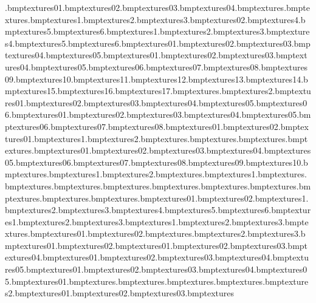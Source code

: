 \gate.bmp textures\gen01.bmp textures\gen02.bmp textures\gen03.bmp textures\gen04.bmp textures\grass.bmp textures\grasscracks.bmp textures\grassedge1.bmp textures\grassedge2.bmp textures\grassedge3.bmp textures\hubpathcorner02.bmp textures\grassedge4.bmp textures\grassedge5.bmp textures\grassedge6.bmp textures\grassshad1.bmp textures\grassshad2.bmp textures\grassshad3.bmp textures\grassshad4.bmp textures\grassshad5.bmp textures\grassshad6.bmp textures\grasstocobble01.bmp textures\grasstocobble02.bmp textures\grasstocobble03.bmp textures\grasstocobble04.bmp textures\grasstocobble05.bmp textures\grasstosand01.bmp textures\grasstosand02.bmp textures\grasstosand03.bmp textures\grasstosand04.bmp textures\grasstosand05.bmp textures\grasstosand06.bmp textures\grasstosand07.bmp textures\grasstosand08.bmp textures\grasstosand09.bmp textures\grasstosand10.bmp textures\grasstosand11.bmp textures\grasstosand12.bmp textures\grasstosand13.bmp textures\grasstosand14.bmp textures\grasstosand15.bmp textures\grasstosand16.bmp textures\grasstosand17.bmp textures\housefloor.bmp textures\housefloor2.bmp textures\hubflowers01.bmp textures\hubflowers02.bmp textures\hubflowers03.bmp textures\hubflowers04.bmp textures\hubflowers05.bmp textures\hubflowers06.bmp textures\hubpath01.bmp textures\hubpath02.bmp textures\hubpath03.bmp textures\hubpath04.bmp textures\hubpath05.bmp textures\hubpath06.bmp textures\hubpath07.bmp textures\hubpath08.bmp textures\hubpathbrick01.bmp textures\hubpathbrick02.bmp textures\hubpathcorner01.bmp textures\hutbrick1.bmp textures\hutbrick2.bmp textures\hutcabtowel.bmp textures\hutceiling.bmp textures\hutcooker.bmp textures\hutfloor.bmp textures\hutfood01.bmp textures\hutfood02.bmp textures\hutfood03.bmp textures\hutfood04.bmp textures\hutfood05.bmp textures\hutfood06.bmp textures\hutfood07.bmp textures\hutfood08.bmp textures\hutfood09.bmp textures\hutfood10.bmp textures\hutsign.bmp textures\hutsink1.bmp textures\hutsink2.bmp textures\hutstripes.bmp textures\hutstripes1.bmp textures\hutstripesbar.bmp textures\hutwall.bmp textures\hutwallcolours.bmp textures\hutwallpans.bmp textures\hutwallplates.bmp textures\hutwallspice.bmp textures\hutworkbread.bmp textures\hutworkbrush.bmp textures\hutworkcorner.bmp textures\hutworks.bmp textures\icecream01.bmp textures\icecream02.bmp textures\icewall1.bmp textures\icewall2.bmp textures\icewall3.bmp textures\icewall4.bmp textures\icewall5.bmp textures\icewall6.bmp textures\icewallex1.bmp textures\icewallex2.bmp textures\icewallex3.bmp textures\icewallexshine1.bmp textures\icewallexshine2.bmp textures\icewallexshine3.bmp textures\jhut.bmp textures\jhutboard01.bmp textures\jhutboard02.bmp textures\jhutbrik.bmp textures\jhutbrik2.bmp textures\jhutbrik3.bmp textures\jhutdoor01.bmp textures\jhutdoor02.bmp textures\jhuthatch01.bmp textures\jhuthatch02.bmp textures\jhuthatch03.bmp textures\jhuthatch04.bmp textures\jhutwin01.bmp textures\jhutwin02.bmp textures\jhutwin03.bmp textures\jhutwin04.bmp textures\jhutwin05.bmp textures\kitchen01.bmp textures\kitchen02.bmp textures\kitchen03.bmp textures\kitchen04.bmp textures\kitchen05.bmp textures\leaf01.bmp textures\logoaquaworld.bmp textures\logoicekingdome.bmp textures\logosafaizone.bmp textures\manyan.bmp textures\manyan2.bmp textures\neon01.bmp textures\neon02.bmp textures\neon03.bmp textures
